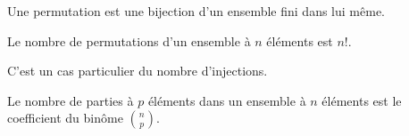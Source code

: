 \begin{defi}[Permutation]
 Une permutation est une bijection d'un ensemble fini dans lui même.
\end{defi}

\begin{propn}
Le nombre de permutations d'un ensemble à $n$ éléments est $n!$.
\end{propn}
\begin{demo}
C'est un cas particulier du nombre d'injections. 
\end{demo}

\begin{propn}
 Le nombre de parties à $p$ éléments dans un ensemble à $n$ éléments est le coefficient du binôme $\binom{n}{p}$.
\end{propn}


